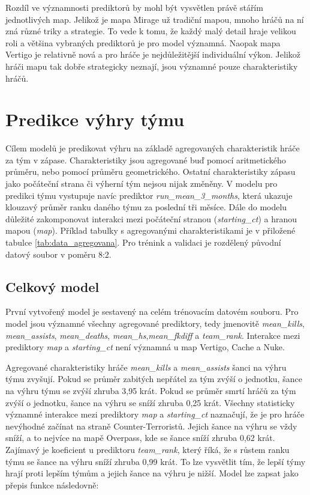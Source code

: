 Rozdíl
{\color{red}
ve významnosti prediktorů
}
by mohl být vysvětlen právě stářím jednotlivých map. Jelikož je mapa Mirage už tradiční mapou, mnoho hráčů na ní zná různé triky a strategie. To vede k tomu, že
každý malý detail hraje velikou roli a většina vybraných prediktorů je pro model významná. Naopak mapa Vertigo je relativně nová a pro hráče je nejdůležitější individuální
výkon. Jelikož hráči mapu tak dobře strategicky neznají, jsou významné pouze charakteristiky hráčů.

\newpage
\section{Predikce výhry týmu}
Cílem modelů je predikovat výhru na základě agregovaných charakteristik hráče za tým v zápase. Charakteristiky jsou agregované buď pomocí aritmetického průměru,
nebo pomocí průměru geometrického. Ostatní charakteristiky zápasu jako počáteční strana či výherní tým nejsou nijak změněny. V modelu pro predikci týmu vystupuje
navíc prediktor \textit{run\_mean\_3\_months}, která ukazuje klouzavý průměr ranku daného týmu za poslední tři měsíce. Dále do modelu důležité zakomponovat interakci
mezi počáteční stranou (\textit{starting\_ct}) a hranou mapou (\textit{map}). Příklad tabulky s agregovanými charakteristikami je v přiložené tabulce \ref{tab:data_agregovana}.
Pro trénink a validaci je rozdělený původní datový soubor v poměru 8:2.

\subsection{Celkový model}



První vytvořený model je sestavený na celém trénovacím datovém souboru. Pro model jsou významné všechny agregované prediktory, tedy jmenovitě \textit{mean\_kills},
\textit{mean\_assists}, \textit{mean\_deaths}, \textit{mean\_hs},\textit{mean\_fkdiff} a \textit{team\_rank}. Interakce mezi prediktory \textit{map} a
\textit{starting\_ct} není významná u map Vertigo, Cache a Nuke.

Agregované charakteristiky hráče \textit{mean\_kills} a \textit{mean\_assists} šanci na výhru týmu zvyšují. Pokud se průměr zabitých nepřátel za tým zvýší o jednotku,
šance na výhru týmu se zvýší zhruba 3,95 krát. Pokud se průměr smrtí hráčů za tým zvýší o jednotku, šance na výhru se sníží zhruba 0,25 krát. Všechny statisticky
významné interakce mezi prediktory \textit{map} a \textit{starting\_ct} naznačují, že je pro hráče nevýhodné začínat na straně Counter-Terroristů. Jejich šance
na výhru se vždy sníží, a to nejvíce na mapě Overpass, kde se šance sníží zhruba 0,62 krát. Zajímavý je koeficient u prediktoru \textit{team\_rank}, který říká,
že s růstem ranku týmu se šance na výhru sníží zhruba 0,99 krát. To lze vysvětlit tím, že lepší týmy hrají proti lepším týmům a jejich 
šance na výhru je nižší. Model lze zapsat jako přepis funkce následovně:

